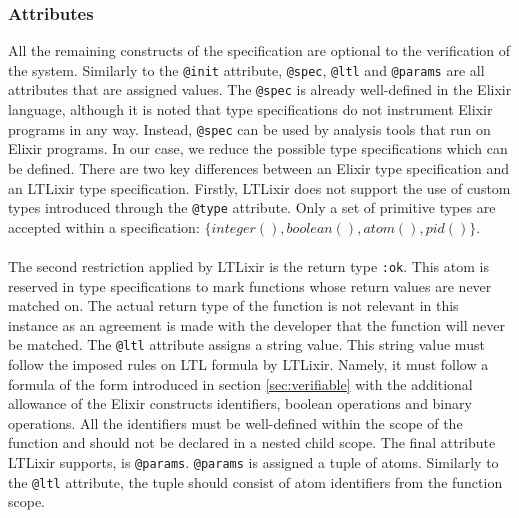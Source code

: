 \subsubsection{Attributes}
All the remaining constructs of the specification are optional to the verification of the system. Similarly to the \texttt{@init} attribute, \texttt{@spec}, \texttt{@ltl} and \texttt{@params} are all attributes that are assigned values. The \texttt{@spec} is already well-defined in the Elixir language, although it is noted that type specifications do not instrument Elixir programs in any way. Instead, \texttt{@spec} can be used by analysis tools that run on Elixir programs. In our case, we reduce the possible type specifications which can be defined. There are two key differences between an Elixir type specification and an LTLixir type specification. Firstly, LTLixir does not support the use of custom types introduced through the \texttt{@type} attribute. Only a set of primitive types are accepted within a specification: $\{integer(), boolean(), atom(), pid()\}$.
\\ \\
The second restriction applied by LTLixir is the return type \texttt{:ok}. This atom is reserved in type specifications to mark functions whose return values are never matched on. The actual return type of the function is not relevant in this instance as an agreement is made with the developer that the function will never be matched. The \texttt{@ltl} attribute assigns a string value. This string value must follow the imposed rules on LTL formula by LTLixir. Namely, it must follow a formula of the form introduced in section \ref{sec:verifiable} with the additional allowance of the Elixir constructs identifiers, boolean operations and binary operations. All the identifiers must be well-defined within the scope of the function and should not be declared in a nested child scope. The final attribute LTLixir supports, is \texttt{@params}. \texttt{@params} is assigned a tuple of atoms. Similarly to the \texttt{@ltl} attribute, the tuple should consist of atom identifiers from the function scope.
\\ \\
